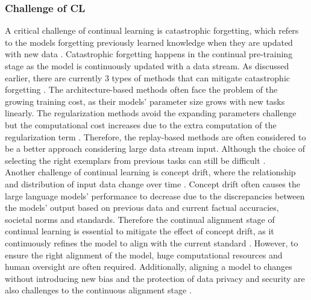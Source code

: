 \documentclass[runningheads]{llncs}
\begin{document}
\subsubsection{Challenge of CL}
\noindent \newline
A critical challenge of continual learning is catastrophic forgetting, which refers to the models forgetting previously learned knowledge 
when they are updated with new data \cite{Gupta23}. Catastrophic forgetting happens in the continual pre-training stage as the model is continuously updated with a data stream.
As discussed earlier, there are currently 3 types of methods that can mitigate catastrophic forgetting \cite{Shi24}. The architecture-based methods often face the problem of the growing 
training cost, as their models' parameter size grows with new tasks linearly\cite{Jovanov}. The regularization methods avoid the expanding parameters challenge but the computational cost
increases due to the extra computation of the regularization term \cite{Wang24}. Therefore, the replay-based methods are often considered to be
a better approach considering large data stream input. Although the choice of selecting the right exemplars from previous tasks can still be difficult \cite{Jovanov}. \\
\noindent \newline
Another challenge of continual learning is concept drift, where the relationship and distribution of input data change over time \cite{Biesi20}. Concept drift often causes the large language models' performance to decrease
due to the discrepancies between the models' output based on previous data and current factual accuracies, societal norms and standards. Therefore the continual alignment stage of continual learning is essential to 
mitigate the effect of concept drift, as it continuously refines the model to align with the current standard \cite{Taori23}.
However, to ensure the right alignment of the model, huge computational resources and human oversight are often required. Additionally, aligning a model to changes without introducing new bias and the protection of data
privacy and security are also challenges to the continuous alignment stage \cite{Shi24}.
\end{document}
